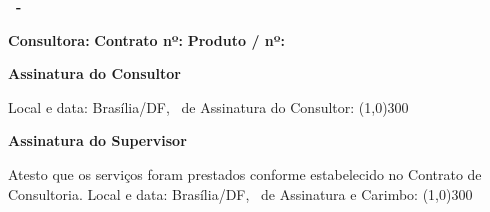 \textbf{\ProjectCode \ -} \ProductDescription

\vspace{3cm}

\begin{minipage}{0.5\textwidth}
  \textbf{Consultora: \MyName}
  \newline
  \textbf{Contrato nº: \ContractNumber}
  \newline
  \textbf{Produto / nº: \ProductNumber}
\end{minipage}

\vspace{2cm}

\textbf{Assinatura do Consultor}

\begin{framed}
Local e data: Brasília/DF, \DiaEntrega \ de \MesEntrega 
\newline
\newline
Assinatura do Consultor: \line(1,0){300}
\end{framed}

\vspace{1cm}

\textbf{Assinatura do Supervisor}

\begin{framed}
Atesto que os serviços foram prestados conforme estabelecido no Contrato
de Consultoria.
\newline
\newline
Local e data: Brasília/DF, \DiaEntrega \ de \MesEntrega 
\newline
\newline
Assinatura e Carimbo: \line(1,0){300}
\end{framed}
